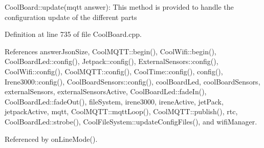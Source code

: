 Cool\+Board\+::update(mqtt answer)\+: This method is provided to handle the configuration update of the different parts 

Definition at line 735 of file Cool\+Board.\+cpp.



References answer\+Json\+Size, Cool\+M\+Q\+T\+T\+::begin(), Cool\+Wifi\+::begin(), Cool\+Board\+Led\+::config(), Jetpack\+::config(), External\+Sensors\+::config(), Cool\+Wifi\+::config(), Cool\+M\+Q\+T\+T\+::config(), Cool\+Time\+::config(), config(), Irene3000\+::config(), Cool\+Board\+Sensors\+::config(), cool\+Board\+Led, cool\+Board\+Sensors, external\+Sensors, external\+Sensors\+Active, Cool\+Board\+Led\+::fade\+In(), Cool\+Board\+Led\+::fade\+Out(), file\+System, irene3000, irene\+Active, jet\+Pack, jetpack\+Active, mqtt, Cool\+M\+Q\+T\+T\+::mqtt\+Loop(), Cool\+M\+Q\+T\+T\+::publish(), rtc, Cool\+Board\+Led\+::strobe(), Cool\+File\+System\+::update\+Config\+Files(), and wifi\+Manager.



Referenced by on\+Line\+Mode().


